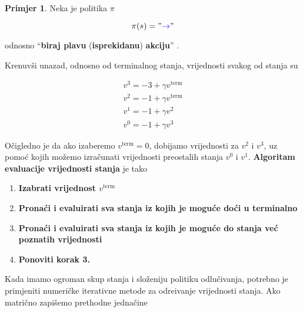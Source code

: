 \documentclass[12pt]{IEEEtran}
\numberwithin{equation}{subsection}
\numberwithin{figure}{subsection}
\theoremstyle{definition}
\newtheorem{example}{Primjer}
\numberwithin{example}{section}
\begin{document}
\begin{example}
    Neka je politika $\pi$

    \begin{equation}
        \pi(s) = "\begingroup\color{blue}\mathbf{\rightarrow}\endgroup"
    \end{equation}

    odnosno \enquote{\textbf{biraj plavu} (\textbf{isprekidanu}) \textbf{akciju}} .

    Krenuv\v{s}i unazad, odnosno od terminalnog stanja,
    vrijednosti svakog od stanja su

    \begin{gather}
        v^{3} = -3 + \gamma v^{\text{term}}\\
        v^{2} = -1 + \gamma v^{\text{term}}\\
        v^{1} = -1 + \gamma v^{2}\\
        v^{0} = -1 + \gamma v^{3}
    \end{gather}

    O\v{c}igledno je da ako izaberemo $v^{\text{term}} = 0$,
    dobijamo vrijednosti za $v^{2}$ i $v^{3}$, uz pomo\'{c}
    kojih mo\v{z}emo izra\v{c}unati vrijednosti preostalih stanja
    $v^{0}$ i $v^{1}$. \textbf{Algoritam evaluacije vrijednosti stanja} je tako

    \begin{enumerate}
        \item \textbf{Izabrati vrijednost $v^{\text{term}}$}
        \item \textbf{Prona\'{c}i i evaluirati sva stanja iz kojih je mogu\'{c}e do\'{c}i u terminalno}
        \item \textbf{Prona\'{c}i i evaluirati sva stanja iz kojih je mogu\'{c}e do stanja ve\'{c} poznatih vrijednosti}
        \item \textbf{Ponoviti korak 3.}
    \end{enumerate}

    
    Kada imamo ogroman skup stanja i slo\v{z}eniju politiku odlu\v{c}ivanja,
    potrebno je primjeniti numeri\v{c}ke iterativne metode
    za odre\dj{}ivanje vrijednosti stanja. Ako matri\v{c}no zapi\v{s}emo
    prethodne jedna\v{c}ine


\end{example}
\end{document}

